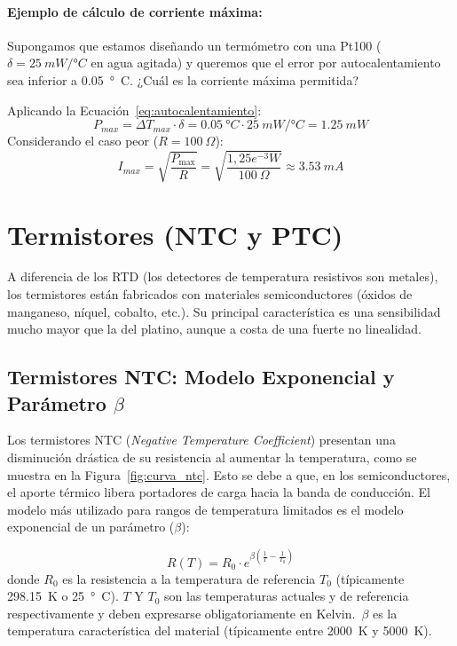 \paragraph{Ejemplo de cálculo de corriente máxima:}
Supongamos que estamos diseñando un termómetro con una Pt100 ($\delta = \qty{25}{mW/\degree C}$ en agua agitada) y queremos que el error por autocalentamiento sea inferior a \qty{0.05}{\degree C}. ¿Cuál es la corriente máxima permitida?

Aplicando la Ecuación~\ref{eq:autocalentamiento}:
\[ P_{max} = \Delta T_{max} \cdot \delta = \qty{0,05}{\degree C} \cdot \qty{25}{mW/\degree C} = \qty{1,25}{mW} \]
Considerando el caso peor ($R = \qty{100}{\Omega}$):
\[ I_{max} = \sqrt{\frac{P_{\max}}{R}} = \sqrt{\frac{\si{1,25e^{-3}}{W}}{\qty{100}{\Omega}}} \approx \qty{3.53}{mA} \]

\section{Termistores (NTC y PTC)}\label{sec:termistores}
A diferencia de los RTD (los detectores de temperatura resistivos son metales), los termistores están fabricados con materiales semiconductores (óxidos de manganeso, níquel, cobalto, etc.). Su principal característica es una sensibilidad mucho mayor que la del platino, aunque a costa de una fuerte no linealidad.

\subsection{Termistores NTC: Modelo Exponencial y Parámetro $\beta$}
Los termistores NTC (\textit{Negative Temperature Coefficient}) presentan una disminución drástica de su resistencia al aumentar la temperatura, como se muestra en la Figura~\ref{fig:curva_ntc}. Esto se debe a que, en los semiconductores, el aporte térmico libera portadores de carga hacia la banda de conducción. El modelo más utilizado para rangos de temperatura limitados es el modelo exponencial de un parámetro ($\beta$):

\begin{equation}\label{eq:modelo_beta}
R(T) = R_0 \cdot e^{\beta \left( \frac{1}{T} - \frac{1}{T_0} \right)}
\end{equation}
donde $R_0$ es la resistencia a la temperatura de referencia $T_0$ (típicamente \qty{298,15}{K} o \qty{25}{\degree C}). $T$ Y $T_0$ son las temperaturas actuales y de referencia respectivamente y deben expresarse obligatoriamente en Kelvin.\ $\beta$ es la temperatura característica del material (típicamente entre \qty{2000}{K} y \qty{5000}{K}).

